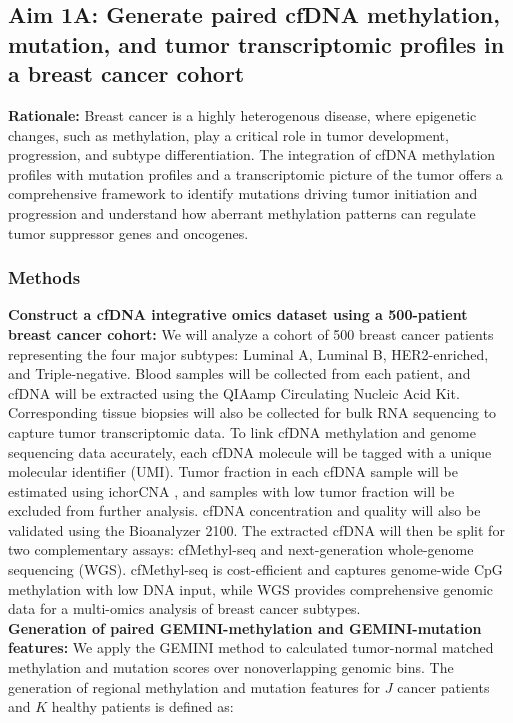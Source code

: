 \documentclass[11pt]{article}
\begin{document}
\subsection*{Aim 1A: Generate paired cfDNA methylation, mutation, and tumor transcriptomic profiles in a breast cancer cohort}
\textbf{Rationale:}
Breast cancer is a highly heterogenous disease, where epigenetic changes, such as methylation, 
play a critical role in tumor development, progression, and subtype differentiation. \cite{guo_breast_2023}
The integration of cfDNA methylation profiles with mutation profiles and a transcriptomic picture of the tumor offers a comprehensive framework to identify mutations driving tumor initiation and progression and understand how aberrant methylation patterns can regulate tumor suppressor genes and oncogenes.
\subsubsection*{Methods}
\textbf{Construct a cfDNA integrative omics dataset using a 500-patient breast cancer cohort:}
We will analyze a cohort of 500 breast cancer patients representing the four major subtypes: Luminal A, Luminal B, HER2-enriched, and Triple-negative. \cite{guo_breast_2023}
Blood samples will be collected from each patient, and cfDNA will be extracted using the QIAamp Circulating Nucleic Acid Kit.
Corresponding tissue biopsies will also be collected for bulk RNA sequencing to capture tumor transcriptomic data.
To link cfDNA methylation and genome sequencing data accurately, each cfDNA molecule will be tagged with a unique molecular identifier (UMI).
Tumor fraction in each cfDNA sample will be estimated using ichorCNA \cite{adalsteinsson_scalable_2017}, and samples with low tumor fraction will be excluded from further analysis.
cfDNA concentration and quality will also be validated using the Bioanalyzer 2100. \cite{polatoglou_isolation_2022}
The extracted cfDNA will then be split for two complementary assays: cfMethyl-seq and next-generation whole-genome sequencing (WGS). cfMethyl-seq is cost-efficient and captures genome-wide CpG methylation with low DNA input, while WGS provides comprehensive genomic data for a multi-omics analysis of breast cancer subtypes.
\medskip \\
\textbf{Generation of paired GEMINI-methylation and GEMINI-mutation features:}
We apply the GEMINI method \cite{bruhm_single-molecule_2023} to calculated tumor-normal matched methylation and mutation
scores over nonoverlapping genomic bins.
The generation of regional methylation and mutation features for $J$ cancer patients and $K$ healthy patients is defined as:
\end{document}
